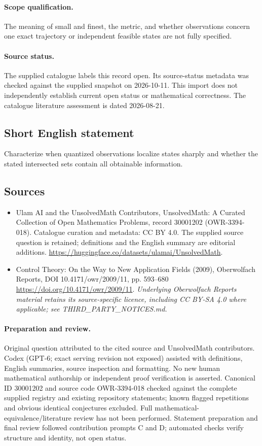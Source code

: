 \documentclass[11pt]{article}
\begin{document}
\paragraph{Scope qualification.}
The meaning of small and finest, the metric, and whether observations concern one exact trajectory or independent feasible states are not fully specified.
\paragraph{Source status.}
The supplied catalogue labels this record open. Its source-status metadata was checked against the supplied snapshot on 2026-10-11. This import does not independently establish current open status or mathematical correctness. The catalogue literature assessment is dated 2026-08-21.
\subsection{Short English statement}
Characterize when quantized observations localize states sharply and whether the stated intersected sets contain all obtainable information.
\subsection{Sources}
\begin{itemize}
\item[S1] Ulam AI and the UnsolvedMath Contributors, UnsolvedMath: A Curated Collection of Open Mathematics Problems, record 30001202 (OWR-3394-018). Catalogue curation and metadata: CC BY 4.0. The supplied source question is retained; definitions and the English summary are editorial additions.
\url{https://huggingface.co/datasets/ulamai/UnsolvedMath}.
\item[S2] Control Theory: On the Way to New Application Fields (2009), Oberwolfach Reports, DOI 10.4171/owr/2009/11, pp. 593--680
\url{https://doi.org/10.4171/owr/2009/11}.
\textit{Underlying Oberwolfach Reports material retains its source-specific licence, including CC BY-SA 4.0 where applicable; see THIRD\_PARTY\_NOTICES.md.}
\end{itemize}
\paragraph{Preparation and review.}
Original question attributed to the cited source and UnsolvedMath contributors. Codex (GPT-6; exact serving revision not exposed) assisted with definitions, English summaries, source inspection and formatting. No new human mathematical authorship or independent proof verification is asserted. Canonical ID 30001202 and source code OWR-3394-018 checked against the complete supplied registry and existing repository statements; known flagged repetitions and obvious identical conjectures excluded. Full mathematical-equivalence/literature review has not been performed. Statement preparation and final review followed contribution prompts C and D; automated checks verify structure and identity, not open status.
\label{end:30001202}
\end{document}
